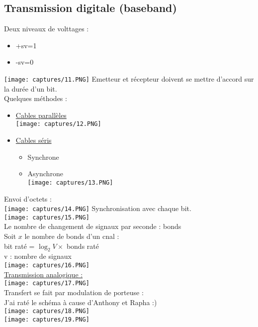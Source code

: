 \documentclass{article}
\begin{document}
    \subsection{Transmission digitale (baseband)}
    Deux niveaux de volttages : \\
    \begin{itemize}
      \item +sv=1
      \item -sv=0
    \end{itemize}
    \texttt{[image: captures/11.PNG]}
    Emetteur et récepteur doivent se mettre d'accord sur la durée d'un bit. \\
    Quelques méthodes : \\ 
    \begin{itemize}
      \item \underline{Cables parallèles} \\
      \texttt{[image: captures/12.PNG]}
      \item \underline{Cables séris}
      \begin{itemize}
        \item Synchrone 
        \item Asynchrone \\
        \texttt{[image: captures/13.PNG]}
      \end{itemize}
    \end{itemize}
    \newpage
    Envoi d'octets : \\ 
    \texttt{[image: captures/14.PNG]}
    Synchronisation avec chaque bit.
    \\
    \texttt{[image: captures/15.PNG]} \\
    Le nombre de changement de signaux par seconde : bonds \\ 
    Soit $x$ le nombre de bonds d'un cnal : \\ 
    bit raté = $\log_2 V \times$ bonds raté \\ 
    v : nombre de signaux \\ 
    \texttt{[image: captures/16.PNG]} \\ 
    \underline{Transmission analogique : } \\
    \texttt{[image: captures/17.PNG]} \\ 
    Transfert se fait par modulation de porteuse : \\ 
    J'ai raté le schéma à cause d'Anthony et Rapha :) \\
    \texttt{[image: captures/18.PNG]} \\
    \texttt{[image: captures/19.PNG]} \\
\end{document}
